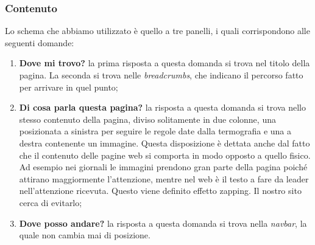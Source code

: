 \begin{center}
\end{center}

\begin{center}
\end{center}

\subsubsection{Contenuto}
Lo schema che abbiamo utilizzato è quello a tre panelli, i quali corrispondono alle seguenti domande:
\begin{enumerate}
\item \textbf{Dove mi trovo?} la prima risposta a questa domanda si trova nel titolo della pagina. La seconda si trova nelle \textit{breadcrumbs}, che indicano il percorso fatto per arrivare in quel punto;
\item \textbf{Di cosa parla questa pagina?} la risposta a questa domanda si trova nello stesso contenuto della pagina, diviso solitamente in due colonne, una posizionata a sinistra per seguire le regole date dalla termografia e una a destra contenente un immagine. Questa disposizione è dettata anche dal fatto che il contenuto delle pagine web si comporta in modo opposto a quello fisico. Ad esempio nei giornali le immagini prendono gran parte della pagina poiché attirano maggiormente l'attenzione, mentre nel web è il testo a fare da leader nell’attenzione ricevuta. Questo viene definito effetto zapping. Il nostro sito cerca di evitarlo;
\item \textbf{Dove posso andare?} la risposta a questa domanda si trova nella \textit{navbar}, la quale non cambia mai di posizione. \\
\end{enumerate}

\begin{center}
\end{center}

